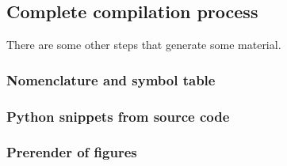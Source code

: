 \subsection{Complete compilation process}

There are some other steps that generate some material.

\subsubsection{Nomenclature and symbol table}


\subsubsection{Python snippets from source code}


\subsubsection{Prerender of figures}

